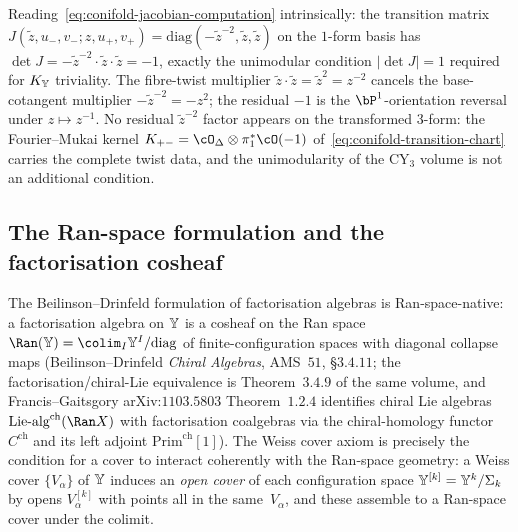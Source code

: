 \begin{remark}
\label{rem:conifold-jacobian-clean}
Reading~\eqref{eq:conifold-jacobian-computation} intrinsically: the transition matrix
$J(\tilde z, u_-, v_-; z, u_+, v_+) = \mathrm{diag}(-\tilde z^{-2}, \tilde z, \tilde z)$
on the $1$-form basis has $\det J = -\tilde z^{-2} \cdot \tilde z \cdot \tilde z = -1$,
exactly the unimodular condition $|\det J| = 1$ required for $K_{\mathbb{Y}}$ triviality. The
fibre-twist multiplier $\tilde z \cdot \tilde z = \tilde z^2 = z^{-2}$ cancels the
base-cotangent multiplier $-\tilde z^{-2} = -z^2$; the residual $-1$ is the
$\bP^1$-orientation reversal under $z \mapsto z^{-1}$. No residual $\tilde z^{-2}$
factor appears on the transformed $3$-form: the Fourier--Mukai kernel $K_{+-} = \cO_\Delta \otimes \pi_1^* \cO(-1)$ of~\eqref{eq:conifold-transition-chart} carries the complete twist data, and the unimodularity of the CY$_3$ volume is not an additional condition.
\end{remark}

\subsection{The Ran-space formulation and the factorisation cosheaf}
\label{subsec:conifold-ran-space-formulation}

The Beilinson--Drinfeld formulation of factorisation algebras is Ran-space-native: a factorisation algebra on $\mathbb{Y}$ is a cosheaf on the Ran space $\Ran(\bY) = \colim_{I} \bY^I / \mathrm{diag}$ of finite-configuration spaces with diagonal collapse maps (Beilinson--Drinfeld \emph{Chiral Algebras}, AMS~$51$, §$3.4.11$; the factorisation/chiral-Lie equivalence is Theorem~$3.4.9$ of the same volume, and Francis--Gaitsgory arXiv:$1103.5803$ Theorem~$1.2.4$ identifies chiral Lie algebras $\mathrm{Lie}\text{-alg}^{\mathrm{ch}}(\Ran X)$ with factorisation coalgebras via the chiral-homology functor $C^{\mathrm{ch}}$ and its left adjoint $\mathrm{Prim}^{\mathrm{ch}}[1]$). The Weiss cover axiom is precisely the condition for a cover to interact coherently with the Ran-space geometry: a Weiss cover $\{V_\alpha\}$ of $\mathbb{Y}$ induces an \emph{open cover} of each configuration space $\mathbb{Y}^{[k]} = \mathbb{Y}^k / \Sigma_k$ by opens $V_{\alpha}^{[k]}$ with points all in the same~$V_\alpha$, and these assemble to a Ran-space cover under the colimit.

